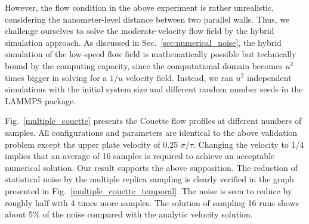 \documentclass[preprint,12pt]{elsarticle}
\begin{document}
However, the flow condition in the above experiment is rather unrealistic, considering the nanometer-level distance between two parallel walls. Thus, we challenge ourselves to solve the moderate-velocity flow field by the hybrid simulation approach. As discussed in Sec.~\ref{sec:numerical_noise}, the hybrid simulation of the low-speed flow field is mathematically possible but technically bound by the computing capacity, since the computational domain becomes $u^2$ times bigger in solving for a $1/u$ velocity field. Instead, we ran $u^2$ independent simulations with the initial system size and different random number seeds in the LAMMPS package.


Fig.~\ref{multiple_couette} presents the Couette flow profiles at different numbers of samples. All configurations and parameters are identical to the above validation problem except the upper plate velocity of 0.25 $\sigma/\tau$.  Changing the velocity to 1/4 implies that an average of 16 samples is required to achieve an acceptable numerical solution. Our result supports the above supposition. The reduction of statistical noise by the multiple replica sampling is clearly verified in the graph presented in Fig.~\ref{multiple_couette_temporal}. The noise is seen to reduce by roughly half with 4 times more samples. The solution of sampling 16 runs shows about 5$\%$ of the noise compared with the analytic velocity solution.
\end{document}

